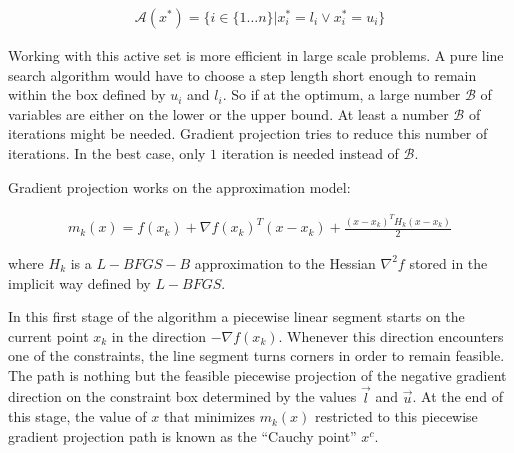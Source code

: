 \begin{equation}
  \begin{aligned}
    \mathcal{A}(x^*) = \{ i \in \{1 \ldots n\} |  x^*_i = l_i \vee  x^*_i = u_i\}
  \end{aligned}
\end{equation}

Working with this active set is more efficient in large scale problems. A pure line search algorithm would have to choose a step length short enough to remain within the box defined by $u_i$ and $l_i$. So if at the optimum, a large number $\mathcal{B}$ of variables are either on the lower or the upper bound. At least a number $\mathcal{B}$ of iterations might be needed. Gradient projection tries to reduce this number of iterations. In the best case, only $1$ iteration is needed instead of $\mathcal{B}$.

Gradient projection works on the approximation model:

\begin{equation} \label{themodel}
  \begin{aligned}
    m_k(x) = f(x_k) + \nabla f(x_k)^T ( x - x_k) + \frac{(x - x_k)^T H_k (x - x_k) }{2}
  \end{aligned}
\end{equation}

where $H_k$ is a $L-BFGS-B$ approximation to the Hessian $\nabla^2 f$ stored in the implicit way defined by $L-BFGS$.

In this first stage of the algorithm a piecewise linear segment starts on the current point $x_k$ in the direction $-\nabla f(x_k)$. Whenever this direction encounters one of the constraints, the line segment turns corners in order to remain feasible. The path is nothing but the feasible piecewise projection of the negative gradient direction on the constraint box determined by the values $\overrightarrow{l}$ and $\overrightarrow{u}$. At the end of this stage, the value of $x$ that minimizes $m_k(x)$ restricted to this piecewise gradient projection path is known as the ``Cauchy point'' $x^c$.


